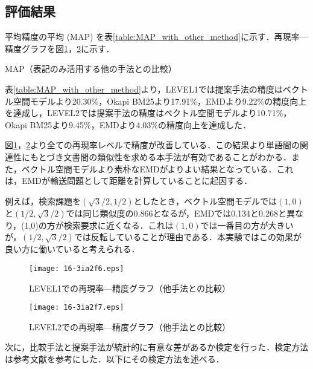 \documentclass[japanese]{jnlp_1.4}
\begin{document}
\subsection{評価結果}

平均精度の平均 (MAP) を表\ref{table:MAP_with_other_method}に示す．再現率—精度グラフを図\ref{fig:RPC_with_other_method(level1)}，\ref{fig:RPC_with_other_method(level2)}に示す．

\begin{table}[b]
\caption{MAP（表記のみ活用する他の手法との比較）}
\label{table:MAP_with_other_method}

\end{table}

表\ref{table:MAP_with_other_method}より，LEVEL1では提案手法の精度はベクトル空間モデルより20.30\%，Okapi BM25より17.91\%，EMDより9.22\%の精度向上を達成し，LEVEL2では提案手法の精度はベクトル空間モデルより10.71\%，Okapi BM25より9.45\%，EMDより4.03\%の精度向上を達成した．

図\ref{fig:RPC_with_other_method(level1)}，\ref{fig:RPC_with_other_method(level2)}より全ての再現率レベルで精度が改善している．この結果より単語間の関連性にもとづき文書間の類似性を求める本手法が有効であることがわかる．また，ベクトル空間モデルより素朴なEMDがよりよい結果となっている．これは，EMDが輸送問題として距離を計算していることに起因する．

例えば，検索課題を$(\sqrt{3}/2,1/2)$としたとき，ベクトル空間モデルでは$(1,0)$と$(1/2,\sqrt{3}/2)$では同じ類似度の0.866となるが，EMDでは0.134と0.268と異なり，(1,0)の方が検索要求に近くなる．これは$(1,0)$では一番目の方が大きいが，$(1/2,\sqrt{3}/2)$では反転していることが理由である．本実験ではこの効果が良い方に働いていると考えられる．

\begin{figure}[t]
\begin{center}
\texttt{[image: 16-3ia2f6.eps]}
\caption{LEVEL1での再現率—精度グラフ（他手法との比較）}
\label{fig:RPC_with_other_method(level1)}
\end{center}
\end{figure}
\begin{figure}[t]
\begin{center}
\texttt{[image: 16-3ia2f7.eps]}
\caption{LEVEL2での再現率—精度グラフ（他手法との比較）}
\label{fig:RPC_with_other_method(level2)}
\end{center}
\end{figure}

次に，比較手法と提案手法が統計的に有意な差があるか検定を行った．検定方法は参考文献\cite{kishida:01}を参考にした．以下にその検定方法を述べる．
\end{document}
